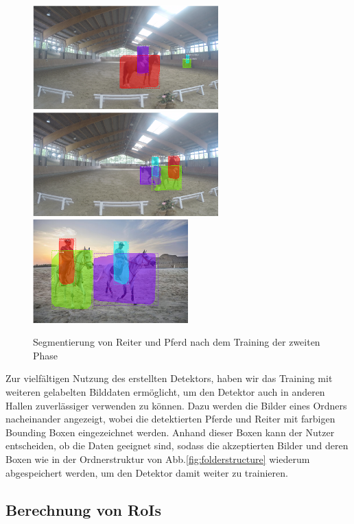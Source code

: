 \begin{figure}
\centering
\includegraphics[height=4cm,trim={12cm 0 3cm 0},clip]{./img/IndoorMaske.png}
\includegraphics[height=4cm,trim={15cm 0 0 0},clip]{./img/IndoorMaske2.png}
\includegraphics[height=4cm,trim={1cm 0 3cm 0},clip]{./img/OutdoorMaske.png}
\caption{Segmentierung von Reiter und Pferd nach dem Training der zweiten Phase}
\label{fig:SegmentierungPhase2}
\end{figure}

Zur vielfältigen Nutzung des erstellten Detektors, haben wir das Training mit weiteren gelabelten Bilddaten ermöglicht, um den Detektor auch in anderen Hallen zuverlässiger verwenden zu können. Dazu werden die Bilder eines Ordners nacheinander angezeigt, wobei die detektierten Pferde und Reiter mit farbigen Bounding Boxen eingezeichnet werden. Anhand dieser Boxen kann der Nutzer entscheiden, ob die Daten geeignet sind, sodass die akzeptierten Bilder und deren Boxen wie in der Ordnerstruktur von Abb.\ref{fig:folderstructure} wiederum abgespeichert werden, um den Detektor damit weiter zu trainieren.

\subsection*{Berechnung von RoIs}

